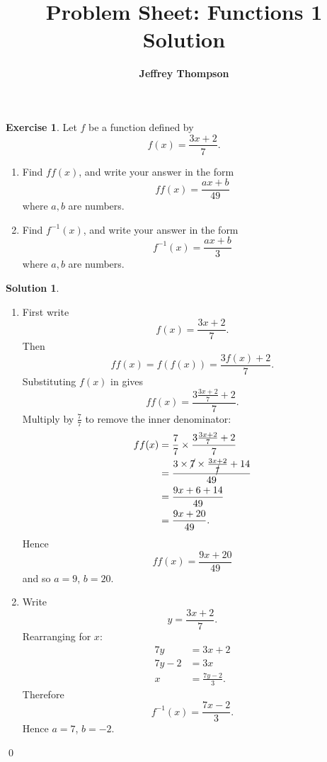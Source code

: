 \documentclass[a4paper]{article}
\theoremstyle{plain}
\theoremstyle{definition}
\newtheorem*{solution}{Solution}
\newtheorem{exercise}{Exercise}
\numberwithin{equation}{subsection}
\begin{document}
\title{\textbf{Problem Sheet: Functions 1 Solution}}
\author{\textbf{Jeffrey Thompson}}
\maketitle

\begin{exercise}
Let $f$ be a function defined by
\[
    f(x) = \frac{3x+2}{7}.
\]
\begin{enumerate}
    \item Find $ff(x)$, and write your answer in the form
    \[
        ff(x) = \frac{ax+b}{49}
    \]
    where $a,b$ are numbers.
    \item Find $f^{-1}(x)$, and write your answer in the form
    \[
        f^{-1}(x) = \frac{ax+b}{3}
    \]
    where $a,b$ are numbers.
\end{enumerate}
\end{exercise}

\begin{solution}

\begin{enumerate}
    \item First write
    \[
        f(x) = \frac{3x+2}{7}.
    \]
    Then
    \[
        ff(x) = f(f(x)) = \frac{3f(x)+2}{7}.
    \]
    Substituting $f(x)$ in gives
    \[
        ff(x) = \frac{3\frac{3x+2}{7}+2}{7}.
    \]
    Multiply by $\frac{7}{7}$ to remove the inner denominator:
    \begin{align*}
        ff(x)
        &= \frac{7}{7}\times\frac{3\frac{3x+2}{7}+2}{7}\\
        &= \frac{3\times\cancel{7}\times\frac{3x+2}{\cancel{7}}+14}{49}\\
        &= \frac{9x+6+14}{49}\\
        &= \frac{9x+20}{49}.
    \end{align*}
    Hence
    \[
        ff(x) = \frac{9x+20}{49}
    \]
    and so $a=9$, $b=20$.

    \item Write
    \[
        y = \frac{3x+2}{7}.
    \]
    Rearranging for $x$:
    \begin{align*}
        7y &= 3x+2\\
        7y-2 &= 3x\\
        x &= \frac{7y-2}{3}.
    \end{align*}
    Therefore
    \[
        f^{-1}(x) = \frac{7x-2}{3}.
    \]
    Hence $a=7$, $b=-2$.
\end{enumerate}
\qed
\end{solution}
\end{document}
